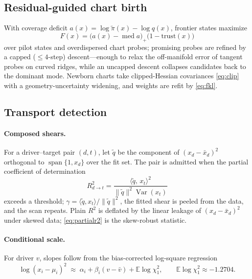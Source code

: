 \documentclass[11pt]{article}
\theoremstyle{remark}
\newcommand{\E}{\mathbb{E}}
\begin{document}
\subsection{Residual-guided chart birth}
With coverage deficit $a(x)=\log\tilde\pi(x)-\log q(x)$, frontier states
maximize
\begin{equation}
F(x)=\bigl(a(x)-\operatorname{med}a\bigr)_+
\bigl(1-\mathrm{trust}(x)\bigr)
\label{eq:birth}
\end{equation}
over pilot states and overdispersed chart probes; promising probes are
refined by a capped ($\le4$-step) descent---enough to relax the
off-manifold error of tangent probes on curved ridges, while an uncapped
descent collapses candidates back to the dominant mode. Newborn charts
take clipped-Hessian covariances \eqref{eq:clip} with a
geometry-uncertainty widening, and weights are refit by \eqref{eq:fkl}.

\subsection{Transport detection}
\paragraph{Composed shears.} For a driver--target pair $(d,t)$, let
$\tilde q$ be the component of $(x_d-\bar x_d)^2$ orthogonal to
$\operatorname{span}\{1,x_d\}$ over the fit set. The pair is admitted
when the partial coefficient of determination
\begin{equation}
R^2_{d\to t}
=\frac{\langle\tilde q,\,x_t\rangle^2}
{\lVert\tilde q\rVert^2\operatorname{Var}(x_t)}
\label{eq:partialr2}
\end{equation}
exceeds a threshold;
$\gamma=\langle\tilde q,x_t\rangle/\lVert\tilde q\rVert^2$, the fitted
shear is peeled from the data, and the scan repeats. Plain $R^2$ is
deflated by the linear leakage of $(x_d-\bar x_d)^2$ under skewed data;
\eqref{eq:partialr2} is the skew-robust statistic.
\paragraph{Conditional scale.} For driver $v$, slopes follow from the
bias-corrected log-square regression
\begin{equation}
\log(x_i-\mu_i)^2\;\approx\;\alpha_i+\beta_i(v-\bar v)+\E\log\chi_1^2,
\qquad \E\log\chi_1^2\approx-1.2704.
\label{eq:scalereg}
\end{equation}
\end{document}
